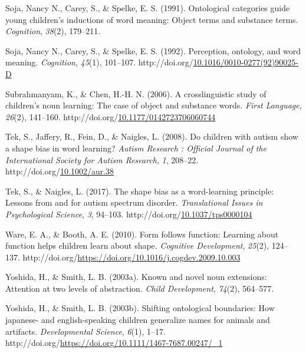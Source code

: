 \documentclass[10pt, letterpaper]{article}
\newenvironment{CSLReferences}%
  {}%
  {\par}
\begin{document}
\begin{CSLReferences}{1}{0}
\leavevmode{}%
Soja, Nancy N., Carey, S., \& Spelke, E. S. (1991). Ontological
categories guide young children's inductions of word meaning: Object
terms and substance terms. \emph{Cognition}, \emph{38}(2), 179--211.

\leavevmode{}%
Soja, Nancy N., Carey, S., \& Spelke, E. S. (1992). Perception,
ontology, and word meaning. \emph{Cognition}, \emph{45}(1), 101--107.
http://doi.org/\href{https://doi.org/10.1016/0010-0277(92)90025-D}{10.1016/0010-0277(92)90025-D}

\leavevmode{}%
Subrahmanyam, K., \& Chen, H.-H. N. (2006). A crosslinguistic study of
children's noun learning: {The} case of object and substance words.
\emph{First Language}, \emph{26}(2), 141--160.
http://doi.org/\href{https://doi.org/10.1177/0142723706060744}{10.1177/0142723706060744}

\leavevmode{}%
Tek, S., Jaffery, R., Fein, D., \& Naigles, L. (2008). Do children with
autism show a shape bias in word learning? \emph{Autism Research :
Official Journal of the International Society for Autism Research},
\emph{1}, 208--22.
http://doi.org/\href{https://doi.org/10.1002/aur.38}{10.1002/aur.38}

\leavevmode{}%
Tek, S., \& Naigles, L. (2017). The shape bias as a word-learning
principle: Lessons from and for autism spectrum disorder.
\emph{Translational Issues in Psychological Science}, \emph{3}, 94--103.
http://doi.org/\href{https://doi.org/10.1037/tps0000104}{10.1037/tps0000104}

\leavevmode{}%
Ware, E. A., \& Booth, A. E. (2010). Form follows function: Learning
about function helps children learn about shape. \emph{Cognitive
Development}, \emph{25}(2), 124--137.
http://doi.org/\url{https://doi.org/10.1016/j.cogdev.2009.10.003}

\leavevmode{}%
Yoshida, H., \& Smith, L. B. (2003a). Known and novel noun extensions:
Attention at two levels of abstraction. \emph{Child Development},
\emph{74}(2), 564--577.

\leavevmode{}%
Yoshida, H., \& Smith, L. B. (2003b). Shifting ontological boundaries:
How japanese- and english-speaking children generalize names for animals
and artifacts. \emph{Developmental Science}, \emph{6}(1), 1--17.
http://doi.org/\url{https://doi.org/10.1111/1467-7687.00247/_1}

\end{CSLReferences}


\end{document}
